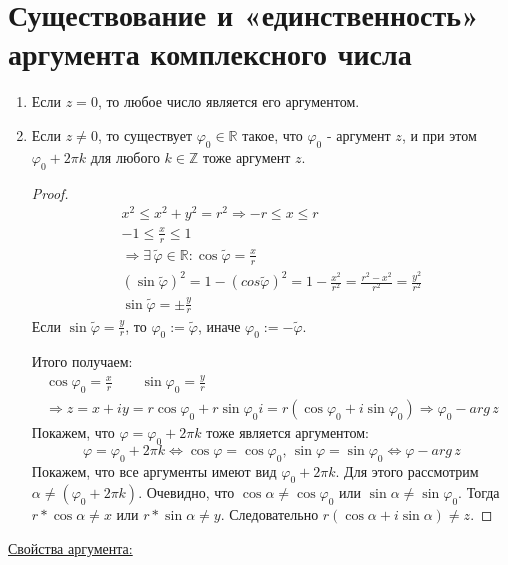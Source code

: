 
\section{Существование и «единственность» аргумента комплексного числа}
\begin{enumerate}
    \item Если $z = 0$, то любое число является его аргументом.
    \item Если $z \neq 0$, то существует $\varphi_0 \in \mathbb{R}$ такое, что $\varphi_0$ - аргумент $z$, и при этом $\varphi_0 + 2\pi k$ для любого $k \in \mathbb{Z}$ тоже аргумент $z$.
    \begin{proof} 
        \begin{gather*}
            x^2 \leqslant x^2 + y^2 = r^2 \Rightarrow -r \leqslant x \leqslant r \\
            -1 \leqslant \frac{x}{r} \leqslant 1 \\
            \Rightarrow \exists\, \widetilde{\varphi} \in \mathbb{R} : \cos\widetilde{\varphi} = \frac{x}{r} \\
            (\sin\widetilde{\varphi})^2 = 1 - (cos\widetilde{\varphi})^2 = 1 - \frac{x^2}{r^2} = \frac{r^2 - x^2}{r^2} = \frac{y^2}{r^2} \\
            \sin\widetilde{\varphi} = \pm\frac{y}{r}
        \end{gather*}
        Если $\sin\widetilde{\varphi} = \frac{y}{r}$, то $\varphi_0 := \widetilde{\varphi}$, иначе $\varphi_0 := -\widetilde{\varphi}$.
  
        Итого получаем:
        \begin{gather*}
            \cos\varphi_0 = \frac{x}{r} \quad\quad \sin\varphi_0 = \frac{y}{r} \\
            \Rightarrow z = x + iy = r\cos\varphi_0 + r\sin\varphi_0i = r(\cos\varphi_0 + i\sin\varphi_0) \Rightarrow \varphi_0 - arg\,z
        \end{gather*}
        Покажем, что $\varphi = \varphi_0 + 2\pi k$ тоже является аргументом:
        \[ \varphi = \varphi_0 + 2\pi k \Leftrightarrow \cos\varphi = \cos\varphi_0,\, \sin\varphi = \sin\varphi_0 \Leftrightarrow \varphi - arg\,z \]
        Покажем, что все аргументы имеют вид $\varphi_0 + 2\pi k$. Для этого рассмотрим $\alpha \neq (\varphi_0 + 2\pi k)$. 
        Очевидно, что $\cos\alpha \neq \cos\varphi_0$ или $\sin\alpha \neq \sin\varphi_0$. Тогда $r * \cos\alpha \neq x$ или $r * \sin\alpha \neq y$. 
        Следовательно $r(\cos\alpha + i\sin\alpha) \neq z$.
    \end{proof}
\end{enumerate}
\underline{Свойства аргумента:}  
  
